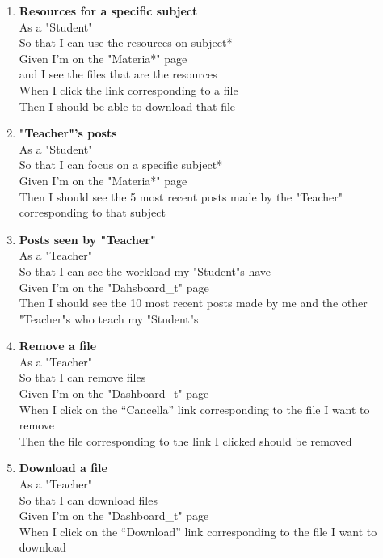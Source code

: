 \documentclass[Lau, binding=0.6cm, oneside]{sapthesis}
\begin{document}
\begin{enumerate}
	\item \textbf{Resources for a specific subject}\\
			As a "Student"\\
			So that I can use the resources on subject*\\
			Given I’m on the "Materia*" page\\
			and I see the files that are the resources\\
			When I click the link corresponding to a file\\
			Then I should be able to download that file\\
	\item \textbf{"Teacher"’s posts}\\
			As a "Student"\\
			So that I can focus on a specific subject*\\
			Given I’m on the "Materia*" page\\
			Then I should see the 5 most recent posts made by the "Teacher" corresponding to that subject\\
	\item \textbf{Posts seen by "Teacher"}\\
			As a "Teacher"\\
			So that I can see the workload my "Student"s have\\
			Given I’m on the "Dahsboard\_t" page\\
			Then I should see the 10 most recent posts made by me and the other "Teacher"s who teach my "Student"s\\
	\item \textbf{Remove a file}\\
			As a "Teacher"\\
			So that I can remove files\\
			Given I’m on the "Dashboard\_t" page\\
			When I click on the “Cancella” link corresponding to the file I want to remove\\
			Then the file corresponding to the link I clicked should be removed\\
	\item \textbf{Download a file}\\
			As a "Teacher"\\
			So that I can download files\\
			Given I’m on the "Dashboard\_t" page\\
			When I click on the “Download” link corresponding to the file I want to download\\

\end{enumerate}
\end{document}
